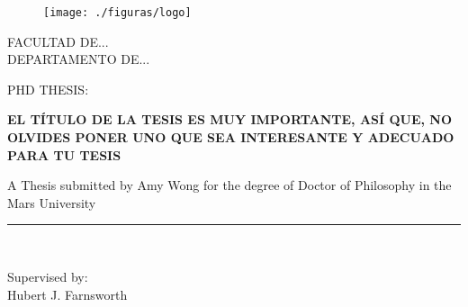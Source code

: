 \documentclass[a4paper,openright,12pt]{report}
\begin{document}
\begin{titlepage}

\begin{center}
\vspace*{-1in}
\begin{figure}[htb]
\begin{center}
\texttt{[image: ./figuras/logo]}
\end{center}
\end{figure}

FACULTAD DE...\\
\vspace*{0.15in}
DEPARTAMENTO DE... \\
\vspace*{0.6in}
\begin{large}
PHD THESIS:\\
\end{large}
\vspace*{0.2in}
\begin{Large}
\textbf{EL TÍTULO DE LA TESIS ES MUY IMPORTANTE, ASÍ QUE, NO OLVIDES PONER UNO QUE SEA INTERESANTE Y ADECUADO PARA TU TESIS} \\
\end{Large}
\vspace*{0.3in}
\begin{large}
A Thesis submitted by Amy Wong for the degree of Doctor of Philosophy in the Mars University\\
\end{large}
\vspace*{0.3in}
\rule{80mm}{0.1mm}\\
\vspace*{0.1in}
\begin{large}
Supervised by: \\
Hubert J. Farnsworth \\
\end{large}
\end{center}

\end{titlepage}
\end{document}
